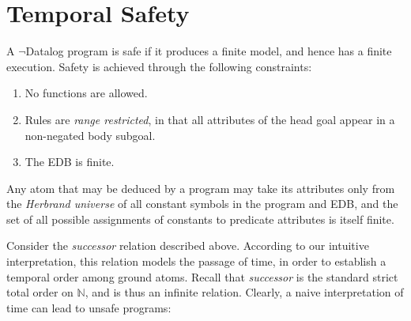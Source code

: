 \section{Temporal Safety}

A $\lnot$Datalog program is safe if it produces a finite model, and hence has a finite execution.  Safety is achieved through the following
constraints:

\begin{enumerate}
\item No functions are allowed.
\item Rules are \emph{range restricted}, in that all attributes of the head goal appear in a non-negated body subgoal.
\item The EDB is finite.
\end{enumerate}

Any atom that may be deduced by a program may take its attributes only from the \emph{Herbrand universe} of
all constant symbols in the program and EDB, and the set of all possible assignments of constants to predicate attributes
is itself finite. 

Consider the \emph{successor} relation described above.  According to our intuitive interpretation, this relation models
the passage of time, in order to establish a temporal order among ground atoms.  
Recall that {\em successor} is the standard strict total order on $\mathbb{N}$,
and is thus an infinite relation.  Clearly, a naive interpretation of time can
lead to unsafe programs:







